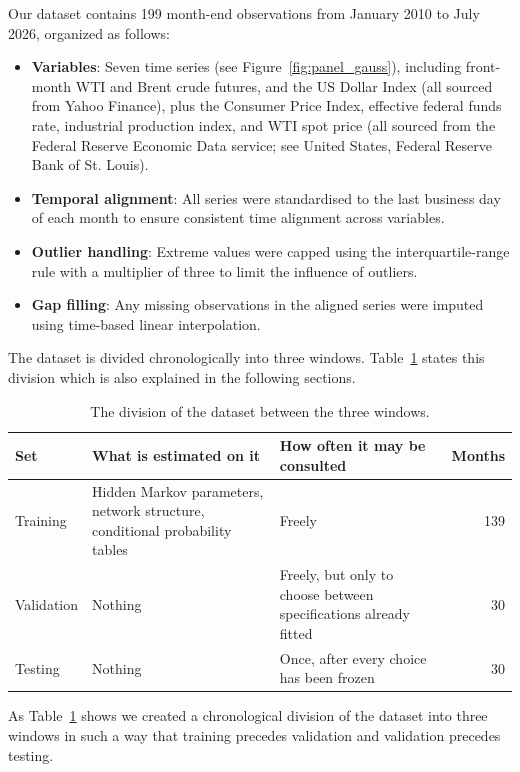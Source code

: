 \documentclass[11pt,a4paper]{article}
\begin{document}
Our dataset contains 199 month-end observations from January 2010 to July 2026, 
organized as follows:
\begin{itemize}
    \item \textbf{Variables}: Seven time series (see Figure~\ref{fig:panel_gauss}), 
    including front-month WTI and 
    Brent crude futures, and the US Dollar Index (all sourced from Yahoo Finance), 
    plus the Consumer Price Index, effective federal funds rate, industrial 
    production index, and WTI spot price (all sourced from the Federal 
    Reserve Economic Data service; see United States, Federal Reserve Bank of St. Louis).
    \item \textbf{Temporal alignment}: All series were standardised to the 
    last business day of each month to ensure consistent time alignment across variables.
    \item \textbf{Outlier handling}: Extreme values were capped using
    the interquartile-range rule with a multiplier of three to limit the influence of outliers.
    \item \textbf{Gap filling}: Any missing observations in the aligned 
    series were imputed using time-based linear interpolation.
\end{itemize}

The dataset is divided chronologically into three windows. Table~\ref{tab:roles} states this 
division which is also explained in the following sections.

\begin{table}[H]
\centering
\caption{The division of the dataset between the three windows.}
\label{tab:roles}
\renewcommand{\arraystretch}{1.2}
\begin{tabular}{@{}lp{5.1cm}p{4.6cm}r@{}}
\toprule
\textbf{Set} & \textbf{What is estimated on it} & \textbf{How often it may be consulted} &
\textbf{Months} \\
\midrule
Training   & Hidden Markov parameters, network structure, conditional probability tables &
Freely & 139 \\
Validation & Nothing & Freely, but only to choose between specifications already fitted & 30 \\
Testing    & Nothing & Once, after every choice has been frozen & 30 \\
\bottomrule
\end{tabular}
\end{table}

As Table~\ref{tab:roles} shows we created a chronological division of the dataset into 
three windows in such a way that training precedes validation and validation precedes testing.
\end{document}

